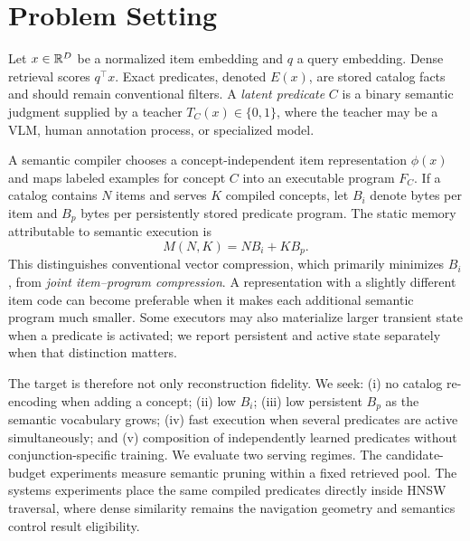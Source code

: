 
\section{Problem Setting}
Let $x\in\mathbb{R}^D$ be a normalized item embedding and $q$ a query embedding. Dense retrieval scores $q^\top x$. Exact predicates, denoted $E(x)$, are stored catalog facts and should remain conventional filters. A \emph{latent predicate} $C$ is a binary semantic judgment supplied by a teacher $T_C(x)\in\{0,1\}$, where the teacher may be a VLM, human annotation process, or specialized model.

A semantic compiler chooses a concept-independent item representation $\phi(x)$ and maps labeled examples for concept $C$ into an executable program $F_C$. If a catalog contains $N$ items and serves $K$ compiled concepts, let $B_i$ denote bytes per item and $B_p$ bytes per persistently stored predicate program. The static memory attributable to semantic execution is
\begin{equation}
    M(N,K)=N B_i + K B_p .
    \label{eq:joint_memory}
\end{equation}
This distinguishes conventional vector compression, which primarily minimizes $B_i$, from \emph{joint item--program compression}. A representation with a slightly different item code can become preferable when it makes each additional semantic program much smaller. Some executors may also materialize larger transient state when a predicate is activated; we report persistent and active state separately when that distinction matters.

The target is therefore not only reconstruction fidelity. We seek: (i) no catalog re-encoding when adding a concept; (ii) low $B_i$; (iii) low persistent $B_p$ as the semantic vocabulary grows; (iv) fast execution when several predicates are active simultaneously; and (v) composition of independently learned predicates without conjunction-specific training. We evaluate two serving regimes. The candidate-budget experiments measure semantic pruning within a fixed retrieved pool. The systems experiments place the same compiled predicates directly inside HNSW traversal, where dense similarity remains the navigation geometry and semantics control result eligibility.

